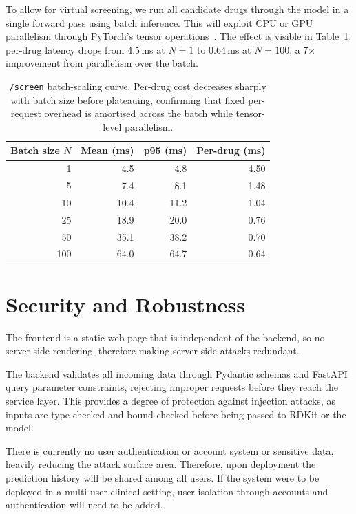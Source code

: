 To allow for virtual screening, we run all candidate drugs through the model in a single forward pass using batch inference.
This will exploit CPU or GPU parallelism through PyTorch's tensor operations~\citep{paszke2019pytorch}.
The effect is visible in Table~\ref{tab:batch_scaling}: per-drug latency drops from 4.5\,ms at $N=1$ to 0.64\,ms at $N=100$, a 7$\times$ improvement from parallelism over the batch.

\begin{table}[H]
    \centering
    \begin{tabular}{rrrr}
        \toprule
        Batch size $N$ & Mean (ms) & p95 (ms) & Per-drug (ms) \\
        \midrule
        1   & 4.5  & 4.8  & 4.50 \\
        5   & 7.4  & 8.1  & 1.48 \\
        10  & 10.4 & 11.2 & 1.04 \\
        25  & 18.9 & 20.0 & 0.76 \\
        50  & 35.1 & 38.2 & 0.70 \\
        100 & 64.0 & 64.7 & 0.64 \\
        \bottomrule
    \end{tabular}
    \caption{\texttt{/screen} batch-scaling curve. Per-drug cost decreases sharply with batch size before plateauing, confirming that fixed per-request overhead is amortised across the batch while tensor-level parallelism.}
    \label{tab:batch_scaling}
\end{table}

\section{Security and Robustness}
The frontend is a static web page that is independent of the backend, so no server-side rendering, therefore making server-side attacks redundant.

The backend validates all incoming data through Pydantic schemas and FastAPI query parameter constraints, rejecting improper requests before they reach the service layer.
This provides a degree of protection against injection attacks, as inputs are type-checked and bound-checked before being passed to RDKit or the model.

There is currently no user authentication or account system or sensitive data, heavily reducing the attack surface area.
Therefore, upon deployment the prediction history will be shared among all users.
If the system were to be deployed in a multi-user clinical setting, user isolation through accounts and authentication will need to be added.
